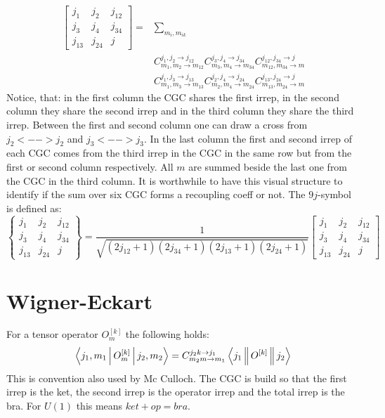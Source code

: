 \documentclass[a4paper,10pt,parskip=full]{scrartcl}
\begin{document}
\begin{equation}
  \label{eq:recoupling-four}
  \begin{split}
  \begin{bmatrix}
    j_1 & j_2 & j_{12} \\
    j_3 & j_4 & j_{34} \\
    j_{13} & j_{24} &j
  \end{bmatrix}
    =
   &\sum_{m_i,m_{ik}}\\
   &C^{j_1,j_2\rightarrow j_{12}}_{m_1,m_2\rightarrow m_{12}}C^{j_3,j_4\rightarrow j_{34}}_{m_3,m_4\rightarrow m_{34}}C^{j_{12},j_{34}\rightarrow j}_{m_{12},m_{34}\rightarrow m}\\
   &C^{j_1,j_3\rightarrow j_{13}}_{m_1,m_3\rightarrow m_{13}}C^{j_2,j_4\rightarrow j_{24}}_{m_2,m_4\rightarrow m_{24}}C^{j_{13},j_{24}\rightarrow j}_{m_{13},m_{24}\rightarrow m}
   \end{split}
\end{equation}
Notice, that: in the first column the CGC shares the first irrep, in the second column they share the second irrep
and in the third column they share the third irrep. Between the first and second column
one can draw a cross from $j_2<-->j_2$ and $j_3<-->j_3$. In the last column the first and second irrep
of each CGC comes from the third irrep in the CGC in the same row but from the first or second column respectively.
All $m$ are summed beside the last one from the CGC in the third column.
It is worthwhile to have this visual structure to identify if the sum over six CGC forms a recoupling coeff or not.
The $9j$-symbol is defined as:
\begin{equation}
  \label{eq:sym-9jsymbol}
  \begin{Bmatrix}
    j_1 & j_2 & j_{12} \\
    j_3 & j_4 & j_{34} \\
    j_{13} & j_{24} &j
  \end{Bmatrix}
   =
  \frac{1}{\sqrt{(2j_{12}+1)(2j_{34}+1)(2j_{13}+1)(2j_{24}+1)}}
  \begin{bmatrix}
    j_1 & j_2 & j_{12} \\
    j_3 & j_4 & j_{34} \\
    j_{13} & j_{24} &j
  \end{bmatrix}
\end{equation}
\section{Wigner-Eckart}
For a tensor operator $O^{[k]}_m$ the following holds:
\begin{equation}
  \label{eq:wigner-eckart-def}
\Braket{j_1,m_1|O^{[k]}_m|j_2,m_2} = C^{j_2k\rightarrow j_1}_{m_2m\rightarrow m_1}\Braket{j_1||O^{[k]}||j_2}
\end{equation}
This is convention also used by Mc Culloch. The CGC is build so that the first irrep is the ket, the second irrep is the operator irrep
and the total irrep is the bra. For $U(1)$ this means $ket+op=bra$.
\end{document}
